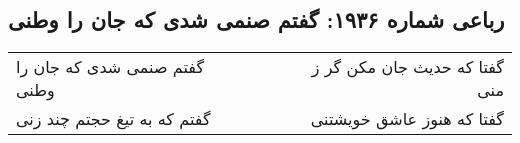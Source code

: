 \begin{center}
\section*{رباعی شماره ۱۹۳۶: گفتم صنمی شدی که جان را وطنی}
\label{sec:1936}
\begin{longtable}{l p{0.5cm} r}
گفتم صنمی شدی که جان را وطنی
&&
گفتا که حدیث جان مکن گر ز منی
\\
گفتم که به تیغ حجتم چند زنی
&&
گفتا که هنوز عاشق خویشتنی
\\
\end{longtable}
\end{center}
